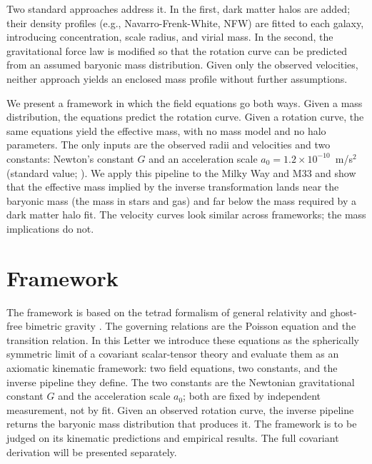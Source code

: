 \documentclass[fleqn,usenatbib]{mnras}
\begin{document}
Two standard approaches address it. In the first, dark matter halos are added; their density profiles (e.g., Navarro-Frenk-White, NFW) are fitted to each galaxy, introducing concentration, scale radius, and virial mass. In the second, the gravitational force law is modified so that the rotation curve can be predicted from an assumed baryonic mass distribution. Given only the observed velocities, neither approach yields an enclosed mass profile without further assumptions.

We present a framework in which the field equations go both ways. Given a mass distribution, the equations predict the rotation curve. Given a rotation curve, the same equations yield the effective mass, with no mass model and no halo parameters. The only inputs are the observed radii and velocities and two constants: Newton's constant $G$ and an acceleration scale $a_0 = 1.2\times10^{-10}$~m/s$^2$ (standard value; \citealt{Milgrom83}). We apply this pipeline to the Milky Way and M33 and show that the effective mass implied by the inverse transformation lands near the baryonic mass (the mass in stars and gas) and far below the mass required by a dark matter halo fit. The velocity curves look similar across frameworks; the mass implications do not.

\section{Framework}
\label{sec:framework}

The framework is based on the tetrad formalism of general relativity \citep{mtw1973,wald1984} and ghost-free bimetric gravity \citep{hassan2012}. The governing relations are the Poisson equation and the transition relation. In this Letter we introduce these equations as the spherically symmetric limit of a covariant scalar-tensor theory and evaluate them as an axiomatic kinematic framework: two field equations, two constants, and the inverse pipeline they define. The two constants are the Newtonian gravitational constant $G$ and the acceleration scale $a_0$; both are fixed by independent measurement, not by fit. Given an observed rotation curve, the inverse pipeline returns the baryonic mass distribution that produces it. The framework is to be judged on its kinematic predictions and empirical results. The full covariant derivation will be presented separately.
\end{document}
